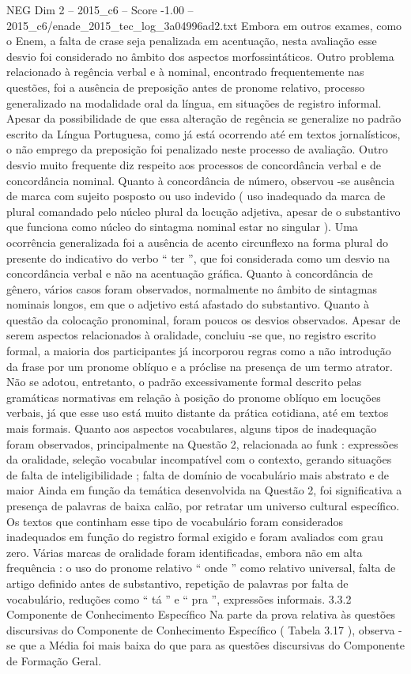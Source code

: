 \begin{textsample}{NEG Dim 2 – 2015\_c6 – Score -1.00 – 2015\_c6/enade\_2015\_tec\_log\_3a04996ad2.txt}
Embora em outros exames, como o Enem, a falta de crase seja penalizada em acentuação, nesta avaliação esse desvio foi considerado no âmbito dos aspectos morfossintáticos.
Outro problema relacionado à regência verbal e à nominal, encontrado frequentemente nas questões, foi a ausência de preposição antes de pronome relativo, processo generalizado na modalidade oral da língua, em situações de registro informal.
Apesar da possibilidade de que essa alteração de regência se generalize no padrão escrito da Língua Portuguesa, como já está ocorrendo até em textos jornalísticos, o não emprego da preposição foi penalizado neste processo de avaliação.
Outro desvio muito frequente diz respeito aos processos de concordância verbal e de concordância nominal.
Quanto à concordância de número, observou -se ausência de marca com sujeito posposto ou uso indevido ( uso inadequado da marca de plural comandado pelo núcleo plural da locução adjetiva, apesar de o substantivo que funciona como núcleo do sintagma nominal estar no singular ).
Uma ocorrência generalizada foi a ausência de acento circunflexo na forma plural do presente do indicativo do verbo “ ter ”, que foi considerada como um desvio na concordância verbal e não na acentuação gráfica.
Quanto à concordância de gênero, vários casos foram observados, normalmente no âmbito de sintagmas nominais longos, em que o adjetivo está afastado do substantivo.
Quanto à questão da colocação pronominal, foram poucos os desvios observados.
Apesar de serem aspectos relacionados à oralidade, concluiu -se que, no registro escrito formal, a maioria dos participantes já incorporou regras como a não introdução da frase por um pronome oblíquo e a próclise na presença de um termo atrator.
Não se adotou, entretanto, o padrão excessivamente formal descrito pelas gramáticas normativas em relação à posição do pronome oblíquo em locuções verbais, já que esse uso está muito distante da prática cotidiana, até em textos mais formais.
Quanto aos aspectos vocabulares, alguns tipos de inadequação foram observados, principalmente na Questão 2, relacionada ao funk : expressões da oralidade, seleção vocabular incompatível com o contexto, gerando situações de falta de inteligibilidade ; falta de domínio de vocabulário mais abstrato e de maior Ainda em função da temática desenvolvida na Questão 2, foi significativa a presença de palavras de baixa calão, por retratar um universo cultural específico.
Os textos que continham esse tipo de vocabulário foram considerados inadequados em função do registro formal exigido e foram avaliados com grau zero.
Várias marcas de oralidade foram identificadas, embora não em alta frequência : o uso do pronome relativo “ onde ” como relativo universal, falta de artigo definido antes de substantivo, repetição de palavras por falta de vocabulário, reduções como “ tá ” e “ pra ”, expressões informais. 3.3.2 Componente de Conhecimento Específico Na parte da prova relativa às questões discursivas do Componente de Conhecimento Específico ( Tabela 3.17 ), observa -se que a Média foi mais baixa do que para as questões discursivas do Componente de Formação Geral.

\end{textsample}
